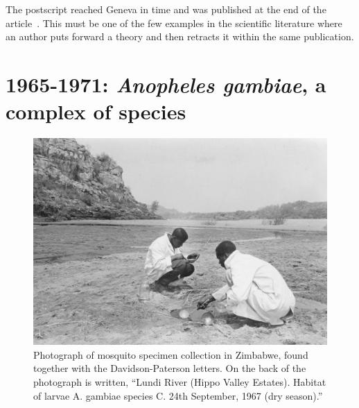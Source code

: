 \documentclass[a4paper,11pt,abstracton,hidelinks]{scrartcl}
\begin{document}
The postscript reached Geneva in time and was published at the end of the article~\parencite{Davidson1964}.
%
This must be one of the few examples in the scientific literature where an author puts forward a theory and then retracts it within the same publication.


\section{1965-1971: \textit{Anopheles gambiae}, a complex of species}\label{sec:1965-1971}


\begin{figure}[t]
\centering
\includegraphics[width=\textwidth]{davidson-letters/Photo-Zimbabwe-Lundi.pdf}
\caption{Photograph of mosquito specimen collection in Zimbabwe, found together with the Davidson-Paterson letters. On the back of the photograph is written, ``Lundi River (Hippo Valley Estates). Habitat of larvae A. gambiae species C. 24th September, 1967 (dry season).''}
    \label{fig:photo-lundi}
\end{figure}
\end{document}
